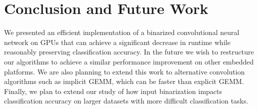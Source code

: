 \documentclass[conference,compsoc]{IEEEtran}
\begin{document}




\section{Conclusion and Future Work}
We presented an efficient implementation of a binarized convolutional neural network on GPUs that can achieve a significant decrease in runtime while reasonably preserving classification accuracy. In the future we wish to restructure our algorithms to achieve a similar performance improvement on other embedded platforms. We are also planning to extend this work to alternative convolution algorithms such as implicit GEMM, which can be faster than explicit GEMM. Finally, we plan to extend our study of how input binarization impacts classification accuracy on larger datasets with more difficult classification tasks.




\end{document}
